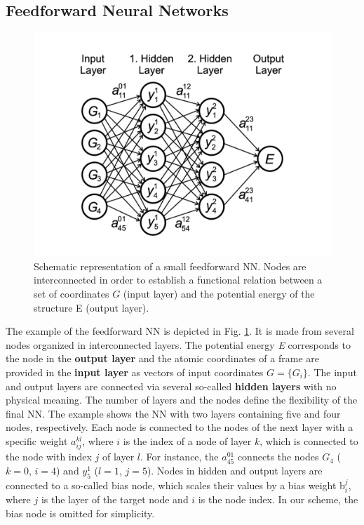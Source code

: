 \documentclass[12pt]{article}
\begin{document}
\subsection{Feedforward Neural Networks}
\begin{figure}[!h]
    \centering
    \includegraphics[scale=0.4]{latex_files/NNP_scheme.jpeg}
    \caption{Schematic representation of a small feedforward NN. Nodes are interconnected in order to establish a functional relation between a set of coordinates $G$ (input layer) and the potential energy of the structure E (output layer). }
    \label{NNP_scheme}
\end{figure}
The example of the feedforward NN is depicted in Fig. \ref{NNP_scheme}. It is made from several nodes organized in interconnected layers. The potential energy \textit{E} corresponds to the node in the \textbf{output layer} and the atomic coordinates of a frame are provided in the \textbf{input layer} as vectors of input coordinates $G=\{G_i\}$. The input and output layers are connected via several so-called \textbf{hidden layers} with no physical meaning. The number of layers and the nodes define the flexibility of the final NN. The example shows the NN with two layers containing five and four nodes, respectively. 
Each node is connected to the nodes of the next layer with a specific weight \textbf{$a_{ij}^{kl}$}, where $i$ is the index of a node of layer $k$, which is connected to the node with index $j$ of layer $l$. For instance, the $a_{45}^{01}$ connects the nodes $G_4$ ($k = 0$, $i=4$) and $y_5^1$ ($l=1$,  $j=5$). Nodes in hidden and output layers are connected to a so-called bias node, which scales their values by a bias weight b$_i^j$, where $j$ is the layer of the target node and $i$ is the node index. In our scheme, the bias node is omitted for simplicity.
\end{document}
